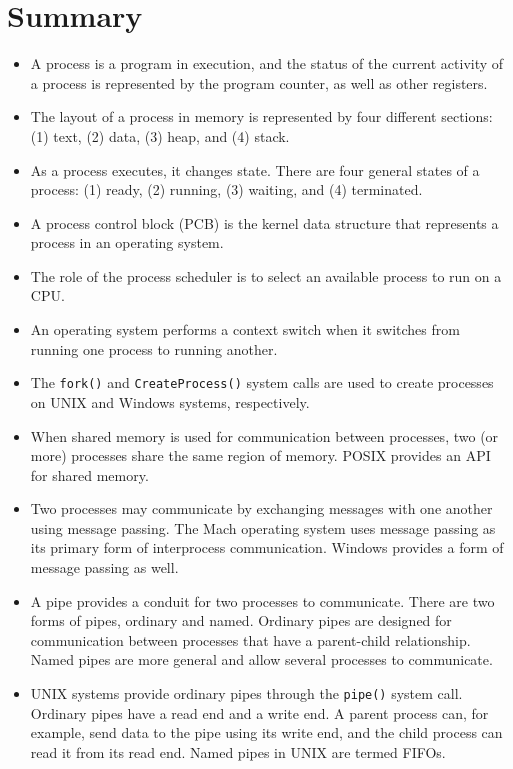 \section{Summary}\label{sec:3.9}

\begin{itemize}
\item A process is a program in execution, and the status of the current activity of a process is represented by the program counter, as well as other registers.
\item The layout of a process in memory is represented by four different sections: (1) text, (2) data, (3) heap, and (4) stack.
\item As a process executes, it changes state. There are four general states of a process: (1) ready, (2) running, (3) waiting, and (4) terminated.
\item A process control block (PCB) is the kernel data structure that represents a process in an operating system.
\item The role of the process scheduler is to select an available process to run on a CPU.
\item An operating system performs a context switch when it switches from running one process to running another.
\item The \texttt{fork()} and \texttt{CreateProcess()} system calls are used to create processes on UNIX and Windows systems, respectively.
\item When shared memory is used for communication between processes, two (or more) processes share the same region of memory. POSIX provides an API for shared memory.
\item Two processes may communicate by exchanging messages with one another using message passing. The Mach operating system uses message passing as its primary form of interprocess communication. Windows provides a form of message passing as well.
\item A pipe provides a conduit for two processes to communicate. There are two forms of pipes, ordinary and named. Ordinary pipes are designed for communication between processes that have a parent-child relationship. Named pipes are more general and allow several processes to communicate.
\item UNIX systems provide ordinary pipes through the \texttt{pipe()} system call. Ordinary pipes have a read end and a write end. A parent process can, for example, send data to the pipe using its write end, and the child process can read it from its read end. Named pipes in UNIX are termed FIFOs.

\end{itemize}
